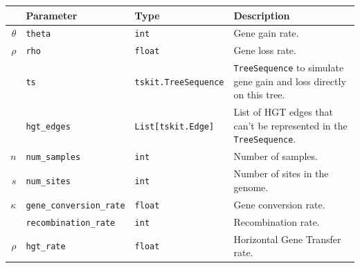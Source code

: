 \begin{table}[H]
    \label{tab:parameters}
    \begin{adjustbox}{width=\textwidth}
        \begin{tabular}{r|lll}
                     & Parameter                                      & Type                                     & Description                                                                                \\
            \hline
            $\theta$ & \texttt{theta}                     & \texttt{int}                 & Gene gain rate.                                                                            \\
            $\rho$   & \texttt{rho}                       & \texttt{float}               & Gene loss rate.                                                                            \\
                     & \texttt{ts}                        & \texttt{tskit.TreeSequence}  & \texttt{TreeSequence} to simulate gene gain and loss directly on this tree.    \\
                     & \texttt{hgt_edges}                 & \texttt{List[tskit.Edge]}    & List of HGT edges that can't be represented in the \texttt{TreeSequence}.      \\
            $n$      & \texttt{num_samples}               & \texttt{int}                 & Number of samples.                                                                         \\
            $s$      & \texttt{num_sites}                 & \texttt{int}                 & Number of sites in the genome.                                                             \\
            $\kappa$ & \texttt{gene_conversion_rate}      & \texttt{float}               & Gene conversion rate.                                                                      \\
                     & \texttt{recombination_rate}        & \texttt{int}                 & Recombination rate.                                                                        \\
            $\rho$   & \texttt{hgt_rate}                  & \texttt{float}               & Horizontal Gene Transfer rate.                                                             \\

\end{tabular}
\end{adjustbox}
\end{table}
